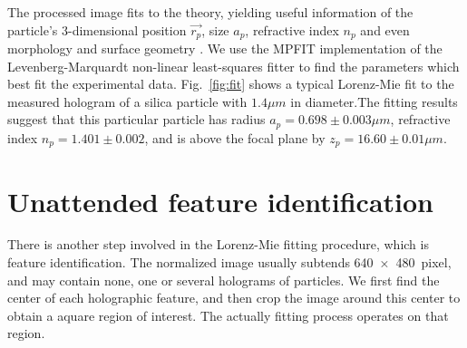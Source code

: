 The processed image fits to the theory, yielding useful information of the particle's 3-dimensional position $\vec{r_p}$, size ${a_p}$, refractive index ${n_p}$ and even morphology and surface geometry \cite{hannel15, wang16, wang16a}. We
use the MPFIT \cite{markwardt09} implementation of the Levenberg-Marquardt non-linear least-squares fitter \cite{more78} to find the parameters which best fit the experimental data. Fig.~\ref{fig:fit} shows a typical Lorenz-Mie fit to the measured hologram of a silica particle with $1.4 \mu m$ in diameter.The fitting results suggest that this particular particle has radius $a_p = 0.698 \pm 0.003 \mu m$, refractive index $n_p = 1.401 \pm 0.002$, and is above the focal plane by $z_p = 16.60 \pm 0.01 \mu m$.

\section{Unattended feature identification}
There is another step involved in the Lorenz-Mie fitting procedure, which is feature 
identification. The normalized image usually subtends \SI{640 x 480}{pixel}, and may 
contain none, one or several holograms of particles. We first find the center of each 
holographic feature, and then crop the image around this center to obtain a aquare region 
of interest. The actually fitting process operates on that region.


